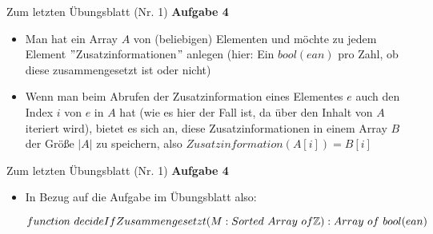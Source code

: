 

\def\haslogo{1}



\date{12. Mai \thisyear}


	
\begin{frame}
	\titlepage
\end{frame}


\iffalse

\begin{frame}{Zum letzten Übungsblatt (Nr. 1)}
	\textbf{Aufgabe 4} \\[0,125cm]
	\begin{itemize}
		\item Man hat ein Array $A$ von (beliebigen) Elementen und möchte zu jedem Element $"$Zusatzinformationen$"$ anlegen (hier: Ein $bool(ean)$ pro Zahl, ob diese zusammengesetzt ist oder nicht)
		\item Wenn man beim Abrufen der Zusatzinformation eines Elementes $e$ auch den Index $i$ von $e$ in $A$ hat (wie es hier der Fall ist, da über den Inhalt von $A$ iteriert wird), bietet es sich an, diese Zusatzinformationen in einem Array $B$ der Größe $|A|$ zu speichern, also $Zusatzinformation(A[i]) = B[i]$
	\end{itemize}
\end{frame}

\begin{frame}{Zum letzten Übungsblatt (Nr. 1)}
	\textbf{Aufgabe 4} \\[0,125cm]
	\begin{itemize}
		\item In Bezug auf die Aufgabe im Übungsblatt also: \\
		\footnotesize
		\begin{exampleblock}{ }
			\begin{algorithm}[H]
				\DontPrintSemicolon
				$function\ decideIfZusammengesetzt(M : Sorted\ Array\ of \mathbb{Z}) : Array\ of\ bool(ean)$\;
			\end{algorithm}
		\end{exampleblock}
	\end{itemize}
\end{frame}


